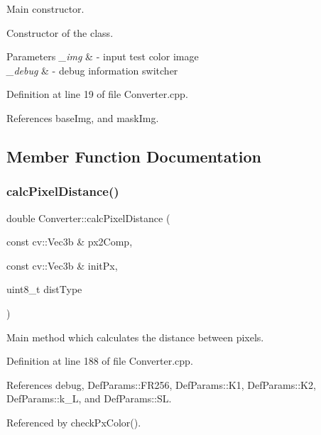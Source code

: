 Main constructor. 

Constructor of the class.


\begin{DoxyParams}{Parameters}
{\em \+\_\+img} & -\/ input test color image \\
\hline
{\em \+\_\+debug} & -\/ debug information switcher \\
\hline
\end{DoxyParams}


Definition at line 19 of file Converter.\+cpp.



References base\+Img, and mask\+Img.



\subsection{Member Function Documentation}
\mbox{\label{class_converter_aa5b0afd52a0319cb627360032a98bf80}} 
\subsubsection{\texorpdfstring{calcPixelDistance()}{calcPixelDistance()}}
{\footnotesize\ttfamily double Converter\+::calc\+Pixel\+Distance (\begin{DoxyParamCaption}\item[{const cv\+::\+Vec3b \&}]{px2\+Comp,  }\item[{const cv\+::\+Vec3b \&}]{init\+Px,  }\item[{uint8\+\_\+t}]{dist\+Type }\end{DoxyParamCaption})\hspace{0.3cm}{\ttfamily [private]}}



Main method which calculates the distance between pixels. 



Definition at line 188 of file Converter.\+cpp.



References debug, Def\+Params\+::\+F\+R256, Def\+Params\+::\+K1, Def\+Params\+::\+K2, Def\+Params\+::k\+\_\+L, and Def\+Params\+::\+SL.



Referenced by check\+Px\+Color().

